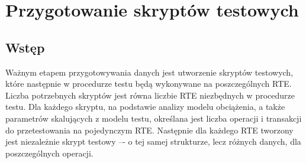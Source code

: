 \section{Przygotowanie skryptów testowych}
\subsection{Wstęp}
Ważnym etapem przygotowywania danych jest utworzenie skryptów testowych, które następnie
w procedurze testu będą wykonywane na poszczególnych RTE. Liczba potrzebnych skryptów
jest równa liczbie RTE niezbędnych w procedurze testu. Dla każdego skryptu,
na podstawie analizy modelu obciążenia, a także parametrów skalujących z modelu testu, 
określana jest liczba operacji i transakcji do przetestowania na pojedynczym RTE.
Następnie dla każdego RTE tworzony jest niezależnie skrypt testowy –- o tej samej strukturze, 
lecz różnych danych, dla poszczególnych operacji.

